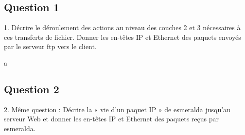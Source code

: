 \documentclass{article}
\begin{document}



\subsection*{Question 1}
\begin{exercise}
    1. Décrire le déroulement des actions au niveau des couches 2 et 3 nécessaires à ces transferts de fichier. Donner les en-têtes IP et Ethernet des paquets envoyés par le serveur ftp vers le client.
\end{exercise}
\begin{resolution}
    a
\end{resolution}

\subsection*{Question 2}
\begin{exercise}
    2. Même question : Décrire la « vie d'un paquet IP » de esmeralda jusqu'au serveur Web et donner les en-têtes IP et Ethernet des paquets reçus par esmeralda.
\end{exercise}
\begin{resolution}

\end{resolution}
\end{document}
